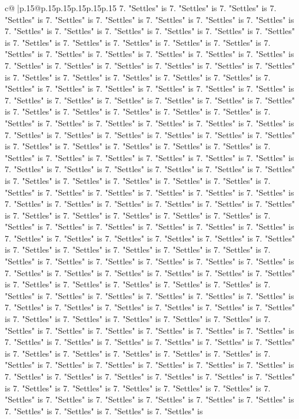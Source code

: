 \documentclass{article}
\begin{document}
{\begin{supertabular}{c@{$\;$}|p{.15\linewidth}@{}p{.15\linewidth}p{.15\linewidth}p{.15\linewidth}p{.15\linewidth}p{.15\linewidth}}
{{{7. "Settles" is 7. "Settles" is 7. "Settles" is 7. "Settles" is 7. "Settles" is 7. "Settles" is 7. "Settles" is 7. "Settles" is 7. "Settles" is 7. "Settles" is 7. "Settles" is 7. "Settles" is 7. "Settles" is 7. "Settles" is 7. "Settles" is 7. "Settles" is 7. "Settles" is 7. "Settles" is 7. "Settles" is 7. "Settles" is 7. "Settles" is 7. "Settles" is 7. "Settles" is 7. "Settles" is 7. "Settles" is 7. "Settles" is 7. "Settles" is 7. "Settles" is 7. "Settles" is 7. "Settles" is 7. "Settles" is 7. "Settles" is 7. "Settles" is 7. "Settles" is 7. "Settles" is 7. "Settles" is 7. "Settles" is 7. "Settles" is 7. "Settles" is 7. "Settles" is 7. "Settles" is 7. "Settles" is 7. "Settles" is 7. "Settles" is 7. "Settles" is 7. "Settles" is 7. "Settles" is 7. "Settles" is 7. "Settles" is 7. "Settles" is 7. "Settles" is 7. "Settles" is 7. "Settles" is 7. "Settles" is 7. "Settles" is 7. "Settles" is 7. "Settles" is 7. "Settles" is 7. "Settles" is 7. "Settles" is 7. "Settles" is 7. "Settles" is 7. "Settles" is 7. "Settles" is 7. "Settles" is 7. "Settles" is 7. "Settles" is 7. "Settles" is 7. "Settles" is 7. "Settles" is 7. "Settles" is 7. "Settles" is 7. "Settles" is 7. "Settles" is 7. "Settles" is 7. "Settles" is 7. "Settles" is 7. "Settles" is 7. "Settles" is 7. "Settles" is 7. "Settles" is 7. "Settles" is 7. "Settles" is 7. "Settles" is 7. "Settles" is 7. "Settles" is 7. "Settles" is 7. "Settles" is 7. "Settles" is 7. "Settles" is 7. "Settles" is 7. "Settles" is 7. "Settles" is 7. "Settles" is 7. "Settles" is 7. "Settles" is 7. "Settles" is 7. "Settles" is 7. "Settles" is 7. "Settles" is 7. "Settles" is 7. "Settles" is 7. "Settles" is 7. "Settles" is 7. "Settles" is 7. "Settles" is 7. "Settles" is 7. "Settles" is 7. "Settles" is 7. "Settles" is 7. "Settles" is 7. "Settles" is 7. "Settles" is 7. "Settles" is 7. "Settles" is 7. "Settles" is 7. "Settles" is 7. "Settles" is 7. "Settles" is 7. "Settles" is 7. "Settles" is 7. "Settles" is 7. "Settles" is 7. "Settles" is 7. "Settles" is 7. "Settles" is 7. "Settles" is 7. "Settles" is 7. "Settles" is 7. "Settles" is 7. "Settles" is 7. "Settles" is 7. "Settles" is 7. "Settles" is 7. "Settles" is 7. "Settles" is 7. "Settles" is 7. "Settles" is 7. "Settles" is 7. "Settles" is 7. "Settles" is 7. "Settles" is 7. "Settles" is 7. "Settles" is 7. "Settles" is 7. "Settles" is 7. "Settles" is 7. "Settles" is 7. "Settles" is 7. "Settles" is 7. "Settles" is 7. "Settles" is 7. "Settles" is 7. "Settles" is 7. "Settles" is 7. "Settles" is 7. "Settles" is 7. "Settles" is 7. "Settles" is 7. "Settles" is 7. "Settles" is 7. "Settles" is 7. "Settles" is 7. "Settles" is 7. "Settles" is 7. "Settles" is 7. "Settles" is 7. "Settles" is 7. "Settles" is 7. "Settles" is 7. "Settles" is 7. "Settles" is 7. "Settles" is 7. "Settles" is 7. "Settles" is 7. "Settles" is 7. "Settles" is 7. "Settles" is 7. "Settles" is 7. "Settles" is 7. "Settles" is 7. "Settles" is 7. "Settles" is 7. "Settles" is 7. "Settles" is 7. "Settles" is 7. "Settles" is 7. "Settles" is 7. "Settles" is 7. "Settles" is 7. "Settles" is 7. "Settles" is 7. "Settles" is 7. "Settles" is 7. "Settles" is 7. "Settles" is 7. "Settles" is 7. "Settles" is 7. "Settles" is 7. "Settles" is }}}
\end{supertabular}}
\end{document}
